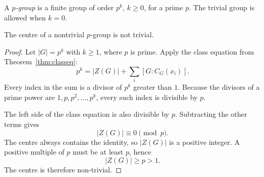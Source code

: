 A \emph{$p$-group} is a finite group of order $p^k$, $k\ge0$, for a prime $p$. The trivial group is allowed when $k=0$.

\begin{corollary}\label{cor:pgroup}
The centre of a nontrivial $p$-group is not trivial.
\end{corollary}
\begin{proof}
Let $|G|=p^k$ with $k\ge1$, where $p$ is prime.
Apply the class equation from Theorem~\ref{thm:classeq}:
\[
p^k=|Z(G)|+\sum_i[G:C_G(x_i)].
\]
Every index in the sum is a divisor of $p^k$
greater than $1$. Because the divisors of a prime
power are $1,p,p^2,\ldots,p^k$, every such index
is divisible by $p$.

The left side of the class equation is also divisible
by $p$. Subtracting the other terms gives
\[
|Z(G)|\equiv0\pmod p.
\]
The centre always contains the identity, so
$|Z(G)|$ is a positive integer. A positive multiple
of $p$ must be at least $p$, hence
\[
\boxed{|Z(G)|\ge p>1}.
\]
The centre is therefore non-trivial.
\end{proof}

